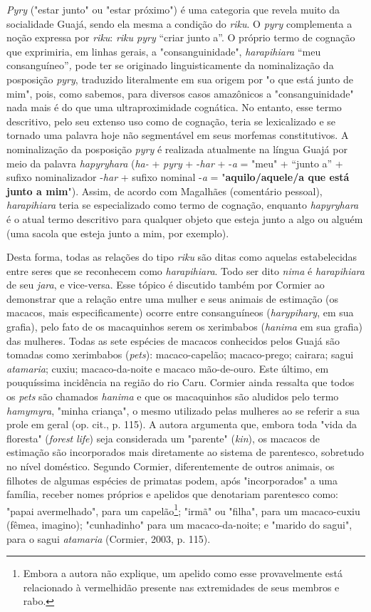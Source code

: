 \emph{Pyry} ("estar junto" ou "estar próximo") é uma categoria que
revela muito da socialidade Guajá, sendo ela mesma a condição do
\emph{riku}. O \emph{pyry} complementa a noção expressa por \emph{riku}:
\emph{riku pyry} ``criar junto a''. O próprio termo de cognação que
exprimiria, em linhas gerais, a "consanguinidade", \emph{harapihiara}
``meu consanguíneo''\emph{,} pode ter se originado linguisticamente da
nominalização da posposição \emph{pyry}, traduzido literalmente em sua
origem por "o que está junto de mim", pois, como sabemos, para diversos
casos amazônicos a "consanguinidade" nada mais é do que uma
ultraproximidade cognática. No entanto, esse termo descritivo, pelo seu
extenso uso como de cognação, teria se lexicalizado e se tornado uma
palavra hoje não segmentável em seus morfemas constitutivos. A
nominalização da posposição \emph{pyry} é realizada atualmente na língua
Guajá por meio da palavra \emph{hapyryhara} (\emph{ha-} + \emph{pyry} +
-\emph{har} + -\emph{a} = "meu" + ``junto a'' + sufixo nominalizador
-\emph{har} + sufixo nominal -\emph{a} = "\textbf{aquilo/aquele/a que
está junto a mim}"). Assim, de acordo com Magalhães (comentário
pessoal), \emph{harapihiara} teria se especializado como termo de
cognação, enquanto \emph{hapyryhara} é o atual termo descritivo para
qualquer objeto que esteja junto a algo ou alguém (uma sacola que esteja
junto a mim, por exemplo).

Desta forma, todas as relações do tipo \emph{riku} são ditas como
aquelas estabelecidas entre seres que se reconhecem como
\emph{harapihiara}. Todo ser dito \emph{nima} é \emph{harapihiara} de
seu \emph{jara}, e vice-versa. Esse tópico é discutido também por
Cormier ao demonstrar que a relação entre uma mulher e seus animais de
estimação (os macacos, mais especificamente) ocorre entre consanguíneos
(\emph{harypihary}, em sua grafia), pelo fato de os macaquinhos serem os
xerimbabos (\emph{hanima} em sua grafia) das mulheres. Todas as sete
espécies de macacos conhecidos pelos Guajá são tomadas como xerimbabos
(\emph{pets}): macaco-capelão; macaco-prego; cairara; sagui
\emph{atamaria}; cuxiu; macaco-da-noite e macaco mão-de-ouro. Este
último, em pouquíssima incidência na região do rio Caru. Cormier ainda
ressalta que todos os \emph{pets} são chamados \emph{hanima} e que os
macaquinhos são aludidos pelo termo \emph{hamymyra}, "minha criança", o
mesmo utilizado pelas mulheres ao se referir a sua prole em geral (op.
cit., p. 115). A autora argumenta que, embora toda "vida da floresta"
(\emph{forest} \emph{life}) seja considerada um "parente" (\emph{kin}),
os macacos de estimação são incorporados mais diretamente ao sistema de
parentesco, sobretudo no nível doméstico. Segundo Cormier,
diferentemente de outros animais, os filhotes de algumas espécies de
primatas podem, após "incorporados" a uma família, receber nomes
próprios e apelidos que denotariam parentesco como: "papai avermelhado",
para um capelão\footnote{Embora a autora não explique, um apelido como
  esse provavelmente está relacionado à vermelhidão presente nas
  extremidades de seus membros e rabo.}; "irmã" ou "filha", para um
macaco-cuxiu (fêmea, imagino); "cunhadinho" para um macaco-da-noite; e
"marido do sagui", para o sagui \emph{atamaria} (Cormier, 2003, p. 115).

